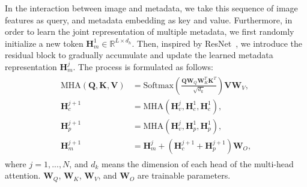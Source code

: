 
In the interaction between image and metadata, we take this sequence of image features as query, and metadata embedding as key and value. 
Furthermore, in order to learn the joint representation of multiple metadata, we first randomly initialize a new token $\bm{H}_m^1 \in \mathbb{R}^{L \times d_h}$. Then, inspired by ResNet~\cite{he2016deep}, we introduce the residual block to gradually accumulate and update the learned metadata representation $\bm{H}_m^j$. 
The process is formulated as follows:
\begin{eqnarray}
\begin{aligned}
\text{MHA}(\bm{Q}, \bm{K}, \bm{V}) &= \textrm{Softmax}\left(\frac{\bm{Q}\bm{W}_Q\bm{W}_K^T\bm{K}^T}{\sqrt{d_k}}\right)\bm{V}\bm{W}_V, \\
\bm{H}_c^{j+1} &= \text{MHA}\left(\bm{H}_v^j, \bm{H}_c^1, \bm{H}_c^1\right),\\
\bm{H}_p^{j+1} &= \text{MHA}\left(\bm{H}_v^j, \bm{H}_p^1, \bm{H}_p^1\right),\\
\bm{H}_m^{j+1} &= \bm{H}_m^{j}+(\bm{H}_c^{j+1}+\bm{H}_p^{j+1})\bm{W}_O,
\end{aligned}
\end{eqnarray}
where $j = 1, ..., N$, and ${d_k}$ means the dimension of each head of the multi-head attention. $\bm{W}_Q$, $\bm{W}_K$, $\bm{W}_V$, and $\bm{W}_O$ are trainable parameters.


